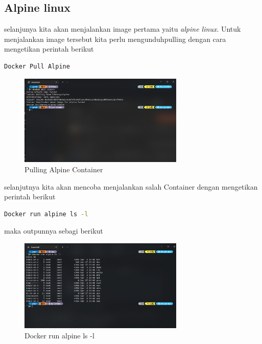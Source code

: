 \documentclass[11pt,a4paper]{article}
\begin{document}
\subsection{Alpine linux}
selanjunya kita akan menjalankan image pertama yaitu \textit{alpine linux}.
Untuk menjalankan image tersebut kita perlu mengunduh{pulling} dengan cara mengetikan perintah berikut
\begin{lstlisting}[language = bash]
	Docker Pull Alpine
\end{lstlisting}
\begin{figure}[h]
	\centering
	\includegraphics[width = 0.7\textwidth]{Figure/asset/pull_alpine.png}
	\caption{Pulling Alpine Container}
\end{figure}

selanjutnya kita akan mencoba menjalankan salah Container dengan mengetikan perintah berikut
\begin{lstlisting}[language = bash]
	Docker run alpine ls -l
\end{lstlisting}
maka outpunnya sebagi berikut
\begin{figure}[h]
	\centering
	\includegraphics[width = 0.7\textwidth]{Figure/asset/run apline ls -l.png}
	\caption{Docker run alpine ls -l}
\end{figure}
\end{document}
